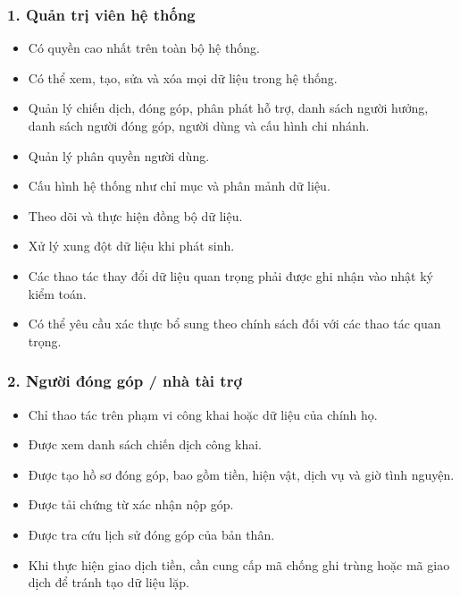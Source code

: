 \documentclass[12pt,a4paper]{article}
\begin{document}
\subsubsection*{1. Quản trị viên hệ thống}

\begin{itemize}
    \item Có quyền cao nhất trên toàn bộ hệ thống.
    \item Có thể xem, tạo, sửa và xóa mọi dữ liệu trong hệ thống.
    \item Quản lý chiến dịch, đóng góp, phân phát hỗ trợ, danh sách người hưởng, danh sách người đóng góp, người dùng và cấu hình chi nhánh.
    \item Quản lý phân quyền người dùng.
    \item Cấu hình hệ thống như chỉ mục và phân mảnh dữ liệu.
    \item Theo dõi và thực hiện đồng bộ dữ liệu.
    \item Xử lý xung đột dữ liệu khi phát sinh.
    \item Các thao tác thay đổi dữ liệu quan trọng phải được ghi nhận vào nhật ký kiểm toán.
    \item Có thể yêu cầu xác thực bổ sung theo chính sách đối với các thao tác quan trọng.
\end{itemize}

\subsubsection*{2. Người đóng góp / nhà tài trợ}

\begin{itemize}
    \item Chỉ thao tác trên phạm vi công khai hoặc dữ liệu của chính họ.
    \item Được xem danh sách chiến dịch công khai.
    \item Được tạo hồ sơ đóng góp, bao gồm tiền, hiện vật, dịch vụ và giờ tình nguyện.
    \item Được tải chứng từ xác nhận nộp góp.
    \item Được tra cứu lịch sử đóng góp của bản thân.
    \item Khi thực hiện giao dịch tiền, cần cung cấp mã chống ghi trùng hoặc mã giao dịch để tránh tạo dữ liệu lặp.
\end{itemize}
\end{document}

